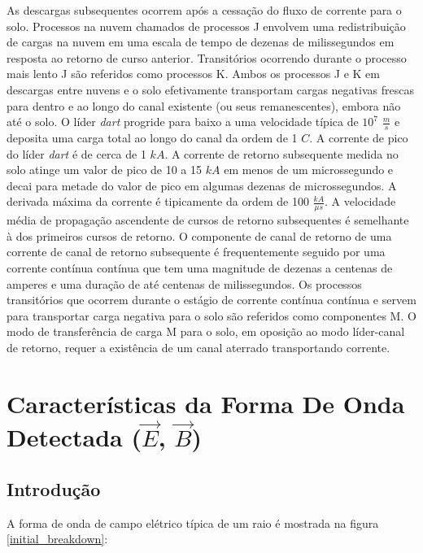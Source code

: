 \documentclass[a4paper, 12pt, onecolumn,singlespacing]{article}
\begin{document}
	As descargas subsequentes ocorrem após a cessação do fluxo de corrente para o solo. Processos na nuvem chamados de processos J envolvem uma redistribuição de cargas na nuvem em uma escala de tempo de dezenas de milissegundos em resposta ao retorno de curso anterior. Transitórios ocorrendo durante o processo mais lento J são referidos como processos K. Ambos os processos J e K em descargas entre nuvens e o solo efetivamente transportam cargas negativas frescas para dentro e ao longo do canal existente (ou seus remanescentes), embora não até o solo. O líder \textit{dart} progride para baixo a uma velocidade típica de $10^7$ $\frac{m}{s}$ e deposita uma carga total ao longo do canal da ordem de 1 $C$. A corrente de pico do líder \textit{dart} é de cerca de 1 $kA$. A corrente de retorno subsequente medida no solo atinge um valor de pico de 10 a 15 $kA$ em menos de um microssegundo e decai para metade do valor de pico em algumas dezenas de microssegundos. A derivada máxima da corrente é tipicamente da ordem de 100 $\frac{kA}{\mu s}$. A velocidade média de propagação ascendente de cursos de retorno subsequentes é semelhante à dos primeiros cursos de retorno. O componente de canal de retorno de uma corrente de canal de retorno subsequente é frequentemente seguido por uma corrente contínua contínua que tem uma magnitude de dezenas a centenas de amperes e uma duração de até centenas de milissegundos. Os processos transitórios que ocorrem durante o estágio de corrente contínua contínua e servem para transportar carga negativa para o solo são referidos como componentes M. O modo de transferência de carga M para o solo, em oposição ao modo líder-canal de retorno, requer a existência de um canal aterrado transportando corrente\cite{RAKOV_UHMAN}.
	
	\section{Características da Forma De Onda Detectada ($\vec{E}$, $\vec{B}$)}

	\subsection{Introdução}
	
	A forma de onda de campo elétrico típica de um raio é mostrada na figura \ref{initial_breakdown}:
	
\end{document}
